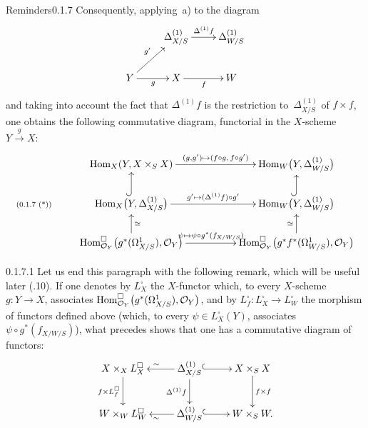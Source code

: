 \begin{enoncerm}{Reminders}{0.1.7}
Consequently, applying~a) to the diagram
\[
\xymatrix{
& \Delta^{(1)}_{X/S} \ar[r]^{\Delta^{(1)}f} & \Delta^{(1)}_{W/S} \\
Y \ar[ur]^{g'} \ar[r]_{g} & X \ar[r]_{f} & W
}
\]
and taking into account the fact that \(\Delta^{(1)}f\) is the restriction
to~\(\Delta^{(1)}_{X/S}\) of \(f\times f\), one obtains the following
commutative diagram, functorial in the \(X\)-scheme
\(Y\xrightarrow{g}X\):
\[
\xymatrix@C=2.2em@R=1.8em{
& \Hom_X(Y,X\times_S X)
  \ar[rr]^-{(g,g')\mapsto(f\circ g,\,f\circ g')}
  && \Hom_W\bigl(Y,\Delta^{(1)}_{W/S}\bigr) \\
\textup{\scriptsize(0.1.7 (*))}
  & \Hom_X\bigl(Y,\Delta^{(1)}_{X/S}\bigr)
  \ar[rr]^-{g'\mapsto(\Delta^{(1)}f)\circ g'}
  \ar@{^{(}->}[u]
  && \Hom_W\bigl(Y,\Delta^{(1)}_{W/S}\bigr)
  \ar@{^{(}->}[u] \\
& \Hom^{\square}_{\OY}\bigl(g^{*}(\Omega^1_{X/S}),\OY\bigr)
  \ar[rr]^-{\psi\mapsto\psi\circ g^{*}(f_{X/W/S})}
  \ar[u]_{\simeq}
  && \Hom^{\square}_{\OY}\bigl(g^{*}f^{*}(\Omega^1_{W/S}),\OY\bigr)
  \ar[u]^{\simeq}
}
\]
\end{enoncerm}

\begin{remark}{0.1.7.1}
\label{III.0.1.7.1}
Let us end this paragraph with the following remark, which will be useful
later (.10). If one denotes by \(L^{\square}_X\) the \(X\)-functor
which, to every \(X\)-scheme \(g\colon Y\to X\), associates
\(\operatorname{Hom}^{\square}_{\mathcal{O}_Y}\bigl(g^{*}(\Omega^1_{X/S}),\mathcal{O}_Y\bigr)\), and by
\(L^{\square}_f\colon L^{\square}_X\to L^{\square}_W\) the morphism of
functors defined above (which, to every \(\psi\in L^{\square}_X(Y)\),
associates \(\psi\circ g^{*}(f_{X/W/S})\)), what precedes shows that one
has a commutative diagram of functors:
\[
\xymatrix{
X\times_X L^{\square}_X \ar[d]_{f\times L^{\square}_f}
  & \Delta^{(1)}_{X/S} \ar[l]_{\sim} \ar@{^{(}->}[r] \ar[d]_{\Delta^{(1)}f}
  & X\times_S X \ar[d]^{f\times f} \\
W\times_W L^{\square}_W
  & \Delta^{(1)}_{W/S} \ar[l]^{\sim} \ar@{^{(}->}[r]
  & W\times_S W.
}
\]
\end{remark}

